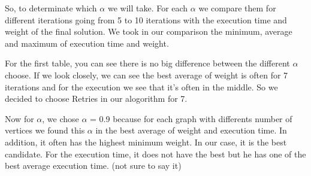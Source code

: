 So, to determinate which $\alpha$ we will take. 
For each $\alpha$ we compare them  for different iterations going from 5 to 10 iterations with the execution time and weight of the final solution.
We took in our comparison the minimum, average and maximum of execution time and weight.

For the first table, you can see there is no big difference between the different $\alpha$ choose.
If we look closely, we can see the best average of weight is often for 7 iterations and for the execution we see that it's often in the middle.
So we decided to choose Retries in our alogorithm for 7.
\bigskip

Now for $\alpha$, we chose $\alpha$ = 0.9 because for each graph with differents number of vertices we found this $\alpha$ in the best average of weight and execution time.
In addition, it often has the highest  minimum weight. In our case, it is the best candidate.
For the execution time, it does not have the best but he has one of the best average execution time.  (not sure to say it)